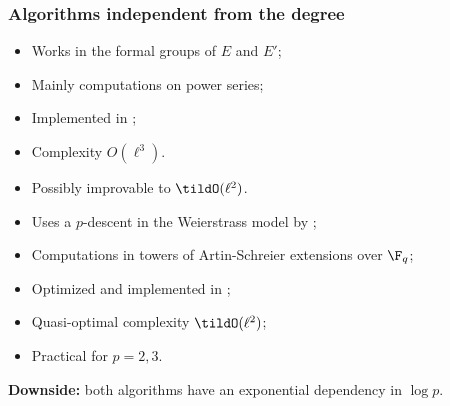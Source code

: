 \documentclass[10pt]{beamer}
\begin{document}
\begin{frame}
  \frametitle{Algorithms independent from the degree}

  \begin{block}{\cite{couveignes94}}
    \begin{itemize}
    \item Works in the formal groups of $E$ and $E'$;
    \item Mainly computations on power series;
    \item Implemented in \parencite{lercier-algorithmique};
    \item Complexity \alert{$O(\ell^3)$}.
    \item Possibly improvable to $\tildO(\ell^2)$.
    \end{itemize}
  \end{block}

  \begin{block}{\cite{couveignes96}}
    \begin{itemize}
    \item Uses a $p$-descent in the Weierstrass model by \cite{voloch90};
    \item Computations in towers of Artin-Schreier extensions over
      $\F_q$;
    \item Optimized and implemented in \parencite{df+schost09,df10};
    \item Quasi-optimal complexity \alert{$\tildO(\ell^2)$};
    \item Practical for $p=2,3$.
    \end{itemize}
  \end{block}

  \textbf{Downside:} both algorithms have an exponential dependency in $\log p$.
\end{frame}

\end{document}
